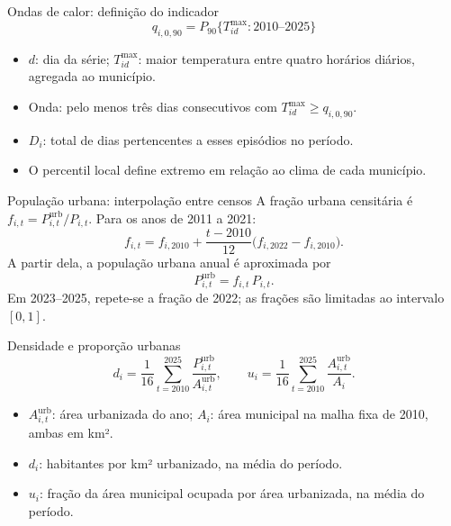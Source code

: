 \documentclass[aspectratio=169,11pt]{beamer}
\newcommand{\fonte}[1]{\par\vspace{0.15cm}{\fontsize{7}{9}\selectfont\color{cinza}#1\par}}
\begin{document}
\begin{frame}{Ondas de calor: definição do indicador}
\[
q_{i,0{,}90}=P_{90}\{T^{\max}_{id}:2010\text{--}2025\}
\]
\begin{itemize}
\item $d$: dia da série; $T^{\max}_{id}$: maior temperatura entre quatro horários diários, agregada ao município. 
\item Onda: pelo menos três dias consecutivos com $T^{\max}_{id}\geq q_{i,0{,}90}$.
\item $D_i$: total de dias pertencentes a esses episódios no período.
\item O percentil local define extremo em relação ao clima de cada município.
\end{itemize}
\end{frame}

\begin{frame}{População urbana: interpolação entre censos}
A fração urbana censitária é $f_{i,t}=P^{\mathrm{urb}}_{i,t}/P_{i,t}$.
\medskip Para os anos de 2011 a 2021:
\[
f_{i,t}=f_{i,2010}+\frac{t-2010}{12}\bigl(f_{i,2022}-f_{i,2010}\bigr).
\]
A partir dela, a população urbana anual é aproximada por
\[
P^{\mathrm{urb}}_{i,t}=f_{i,t}\,P_{i,t}.
\]
Em 2023--2025, repete-se a fração de 2022; as frações são limitadas ao intervalo $[0,1]$.
\end{frame}

\begin{frame}{Densidade e proporção urbanas}
\[
d_i=\frac1{16}\sum_{t=2010}^{2025}\frac{P^{\mathrm{urb}}_{i,t}}{A^{\mathrm{urb}}_{i,t}},
\qquad
u_i=\frac1{16}\sum_{t=2010}^{2025}\frac{A^{\mathrm{urb}}_{i,t}}{A_i}.
\]
\begin{itemize}
\item $A^{\mathrm{urb}}_{i,t}$: área urbanizada do ano; $A_i$: área municipal na malha fixa de 2010, ambas em km².
\item $d_i$: habitantes por km² urbanizado, na média do período.
\item $u_i$: fração da área municipal ocupada por área urbanizada, na média do período.
\end{itemize}
\end{frame}
\end{document}
